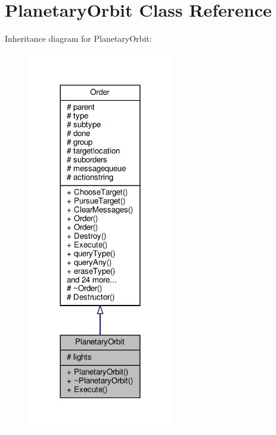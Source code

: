 \hypertarget{classPlanetaryOrbit}{}\section{Planetary\+Orbit Class Reference}
\label{classPlanetaryOrbit}


Inheritance diagram for Planetary\+Orbit\+:
\nopagebreak
\begin{figure}[H]
\begin{center}
\leavevmode
\includegraphics[width=180pt]{d5/d67/classPlanetaryOrbit__inherit__graph}
\end{center}
\end{figure}


